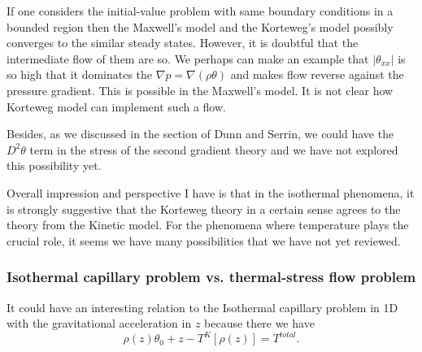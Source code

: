 \documentclass[a4paper,12pt]{article}
\begin{document}
If one considers the initial-value problem with same boundary conditions in a bounded region then the Maxwell's model and the Korteweg's model possibly converges to the similar steady states. However, it is doubtful that the intermediate flow of them are so. We perhaps can make an example that 
$|\theta_{xx}|$ is so high that it dominates the $\nabla p=\nabla (\rho\theta)$ and makes flow reverse against the pressure gradient. This is possible in the Maxwell's model. It is not clear how Korteweg model can implement such a flow.

Besides, as we discussed in the section of Dunn and Serrin, we could have the $D^2\theta$ term in the stress of the second gradient theory and we have not explored this possibility yet. 

Overall impression and perspective I have is that in the isothermal phenomena, it is strongly suggestive that the Korteweg theory in a certain sense agrees to the theory from the Kinetic model. For the phenomena where temperature plays the crucial role, it seems we have many possibilities that we have not yet reviewed.

\subsubsection{Isothermal capillary problem vs. thermal-stress flow problem}
It could have an interesting relation to the Isothermal capillary problem in 1D with the gravitational acceleration in $z$ because there we have
$$\rho(z)\theta_0+z - T^K[\rho(z)] = T^{total}.$$
\end{document}
